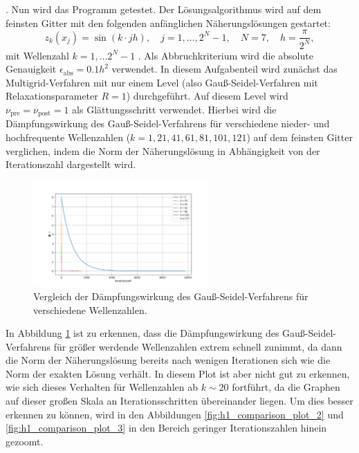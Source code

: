 \documentclass[11pt,a4paper]{article}
\begin{document}
. Nun wird das Programm getestet. Der Lösungsalgorithmus wird auf dem feinsten Gitter mit den folgenden anfänglichen Näherungslösungen gestartet:
\begin{equation*}
    z_k(x_j) = \sin{(k \cdot j h)} , \quad j = 1 , \dots , 2^N - 1 , \quad N = 7 , \quad h = \frac{\pi}{2^N} ,
\end{equation*} mit Wellenzahl $k = 1 , \dots 2^N - 1$ . Als Abbruchkriterium wird die absolute Genauigkeit $\epsilon_{\mathrm{abs}} = 0.1 h^2$ verwendet. In diesem Aufgabenteil wird zunächst das Multigrid-Verfahren mit nur einem Level (also Gauß-Seidel-Verfahren mit Relaxationsparameter $R=1$) durchgeführt.
Auf diesem Level wird $\nu_{\mathrm{pre}} = \nu_{\mathrm{post}} = 1$ als Glättungsschritt verwendet. Hierbei wird die Dämpfungswirkung des Gauß-Seidel-Verfahrens für verschiedene nieder- und hochfrequente Wellenzahlen ($k = 1, 21, 41, 61, 81, 101, 121$) auf dem feinsten Gitter verglichen,
indem die Norm der Näherungslösung in Abhängigkeit von der Iterationszahl dargestellt wird.
\begin{figure}[htbp]
    \centering
    \includegraphics[width=0.6\textwidth,scale=0.7]{h1_comparison_plot_1}
    \caption[Vergleich der Dämpfungswirkung des Gauß-Seidel-Verfahrens für verschiedene Wellenzahlen.]{Vergleich der Dämpfungswirkung des Gauß-Seidel-Verfahrens für verschiedene Wellenzahlen.}\label{fig:h1_comparison_plot_1}
\end{figure} In Abbildung \ref{fig:h1_comparison_plot_1} ist zu erkennen, dass die Dämpfungswirkung des Gauß-Seidel-Verfahrens für größer werdende Wellenzahlen extrem schnell zunimmt, da dann die Norm der Näherungslösung bereits nach wenigen Iterationen sich wie die Norm der exakten Lösung verhält. In diesem Plot ist aber nicht gut zu erkennen, wie sich dieses Verhalten
für Wellenzahlen ab $k \sim 20$ fortführt, da die Graphen auf dieser großen Skala an Iterationsschritten übereinander liegen. Um dies besser erkennen zu können, wird in den Abbildungen \ref{fig:h1_comparison_plot_2} und \ref{fig:h1_comparison_plot_3} in den Bereich geringer Iterationszahlen hinein gezoomt.
\end{document}
